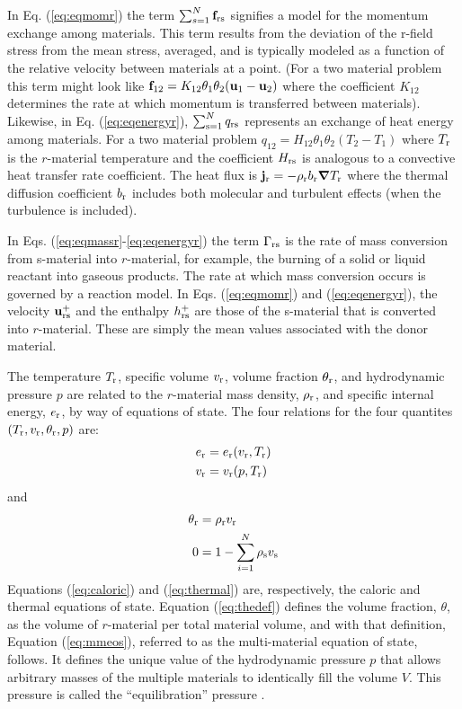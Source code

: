In Eq. (\ref{eq:eqmomr}) the term $\sum_{s=1}^{N}\mathbf{f}_{{\rm r}{\rm s}}$ signifies
a model for the momentum exchange among materials.  This term results from
the deviation of the r-field stress from the mean stress, averaged, and is
typically modeled as a function of the relative velocity between materials
at a point. (For a two material problem this term might look like $\mathbf{f}_{12}
= K_{12}\theta_1\theta_2(\mathbf{u}_1 - \mathbf{u}_2)$ where the coefficient $K_{12}$
determines the rate at which momentum is transferred between materials).
Likewise, in Eq. (\ref{eq:eqenergyr}), $\sum_{{\rm s}=1}^{N} q_{{\rm r}{\rm s}}$
represents an exchange of heat energy among materials.  For a two material
problem $q_{12} = H_{12}\theta_1\theta_2(T_2 - T_1)$ where $T_{\rm r}$ is the
$r$-material temperature and the coefficient $H_{{\rm r}{\rm s}}$ is analogous to a
convective heat transfer rate coefficient.  The heat flux is $\mathbf{j}_{\rm r} =
-\rho_{\rm r} b_{\rm r} \boldsymbol{\nabla} T_{\rm r}$ where the thermal diffusion coefficient
$b_{\rm r}$ includes both molecular and turbulent effects (when the turbulence
is included).

In Eqs. (\ref{eq:eqmassr}-\ref{eq:eqenergyr}) the term $\Gamma_{{\rm r}{\rm s}}$ is
the rate of mass conversion from s-material into $r$-material, for example,
the burning of a solid or liquid reactant into gaseous products.  The rate at which
mass conversion occurs is governed by a reaction model.  In Eqs. (\ref{eq:eqmomr})
and (\ref{eq:eqenergyr}), the velocity $\mathbf{u}_{{\rm r}{\rm s}}^+$ and the enthalpy
$h_{{\rm r}{\rm s}}^+$ are those of the s-material that is converted into $r$-material.
These are simply the mean values associated with the donor material.

The temperature $T_{\rm r}$, specific volume $v_{\rm r}$, volume fraction
$\theta_{\rm r}$, and hydrodynamic pressure $p$ are related to the $r$-material
mass density, $\rho_{\rm r}$, and specific internal energy, $e_{\rm r}$, by way
of equations of state.  The four relations for the four quantites $(T_{\rm r},
v_{\rm r}, \theta_{\rm r}, p)$ are:
\begin{align}
e_{\rm r} &= e_{\rm r}(v_{\rm r}, T_{\rm r}) \label{eq:caloric} \\
v_{\rm r} &= v_{\rm r}(p, T_{\rm r}) \label{eq:thermal}
\end{align}
and
\begin{align}
\theta_{\rm r} &= \rho_{\rm r} v_{\rm r} \label{eq:thedef} \\
0 &= 1 - \sum_{i=1}^N\rho_{\rm s} v_{\rm s} \label{eq:mmeos}
\end{align}
Equations (\ref{eq:caloric}) and (\ref{eq:thermal}) are, respectively, the caloric
and thermal equations of state.  Equation (\ref{eq:thedef}) defines the volume
fraction, $\theta$, as the volume of $r$-material per total material volume,
and with that definition, Equation (\ref{eq:mmeos}), referred to as the
multi-material equation of state, follows.  It defines the unique value of
the hydrodynamic pressure $p$ that allows arbitrary masses of the multiple
materials to identically fill the volume $V$.  This pressure is called the
``equilibration'' pressure \cite{kashiwaICE94}.

